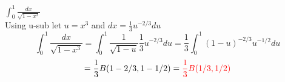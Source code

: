 \item [3.] \( \displaystyle \int_0^1\frac{dx}{\sqrt{1-x^3}}\)
\\[2mm]Using u-sub let $u=x^3$ and $dx = \frac{1}{3}u^{-2/3}du$
\[
    \int_0^1\frac{dx}{\sqrt{1-x^3}} 
    = \int_0^1\frac{1}{\sqrt{1-u}}\frac{1}{3}u^{-2/3}du
    = \frac{1}{3} \int_0^1 (1-u)^{-2/3}u^{-1/2}du
\]
\[
    = \frac{1}{3}B(1-2/3,1-1/2)=\textcolor{red}{\frac{1}{3}B(1/3,1/2)}
\]